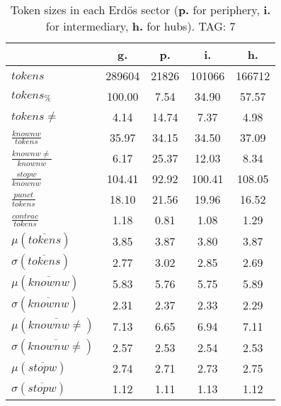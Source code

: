 \begin{table}[h!]
\begin{center}
\begin{tabular}{| l || c | c | c | c |}\hline
 & {\bf g.} & {\bf p.} & {\bf i.} & {\bf h.} \\\hline\hline
$tokens$ & 289604  & 21826  & 101066  & 166712 \\
$tokens_{\%}$ & 100.00  & 7.54  & 34.90  & 57.57 \\
$tokens \neq$ & 4.14  & 14.74  & 7.37  & 4.98 \\\hline
$\frac{knownw}{tokens}$ & 35.97  & 34.15  & 34.50  & 37.09 \\
$\frac{knownw \neq}{knownw}$ & 6.17  & 25.37  & 12.03  & 8.34 \\\hline
$\frac{stopw}{knownw}$ & 104.41  & 92.92  & 100.41  & 108.05 \\
$\frac{punct}{tokens}$ & 18.10  & 21.56  & 19.96  & 16.52 \\
$\frac{contrac}{tokens}$ & 1.18  & 0.81  & 1.08  & 1.29 \\\hline\hline
$\mu(\overline{tokens})$ & 3.85  & 3.87  & 3.80  & 3.87 \\
$\sigma(\overline{tokens})$ & 2.77  & 3.02  & 2.85  & 2.69 \\\hline
$\mu(\overline{knownw})$ & 5.83  & 5.76  & 5.75  & 5.89 \\
$\sigma(\overline{knownw})$ & 2.31  & 2.37  & 2.33  & 2.29 \\\hline
$\mu(\overline{knownw \neq})$ & 7.13  & 6.65  & 6.94  & 7.11 \\
$\sigma(\overline{knownw \neq})$ & 2.57  & 2.53  & 2.54  & 2.53 \\\hline
$\mu(\overline{stopw})$ & 2.74  & 2.71  & 2.73  & 2.75 \\
$\sigma(\overline{stopw})$ & 1.12  & 1.11  & 1.13  & 1.12 \\\hline
\end{tabular}
\caption{Token sizes in each Erd\"os sector ({{\bf p.}} for periphery, {{\bf i.}} for intermediary, {{\bf h.}} for hubs). TAG: 7}
\end{center}
\end{table}